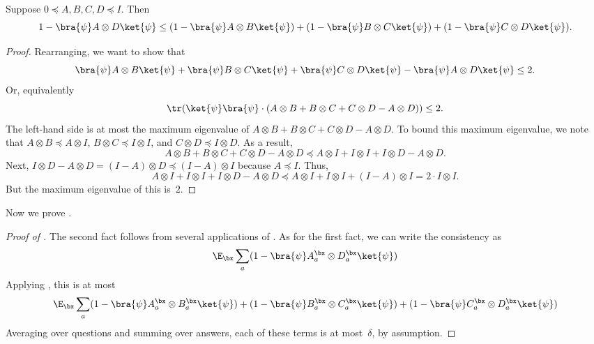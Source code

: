 \begin{fact}\label{fact:fun-matrix-fact}
Suppose $0 \preceq A, B, C, D \preceq I$.  Then
\begin{equation*}
1- \bra{\psi} A \otimes D \ket{\psi}
\leq (1 - \bra{\psi} A \otimes B \ket{\psi}) + (1 - \bra{\psi} B \otimes C \ket{\psi}) + (1 - \bra{\psi} C \otimes D \ket{\psi}).
\end{equation*}
\end{fact}
\begin{proof}
Rearranging, we want to show that
\begin{equation*}
\bra{\psi} A \otimes B \ket{\psi} + \bra{\psi} B \otimes C \ket{\psi} + \bra{\psi} C \otimes D \ket{\psi} - \bra{\psi} A \otimes D \ket{\psi}
\leq 2.
\end{equation*}
Or, equivalently
\begin{equation*}
\tr(\ket{\psi}\bra{\psi} \cdot (A \otimes B + B \otimes C + C \otimes D - A \otimes D)) \leq 2.
\end{equation*}
The left-hand side is at most the maximum eigenvalue of $A \otimes B + B \otimes C + C \otimes D - A \otimes D$.
To bound this maximum eigenvalue, we note that $A \otimes B \preceq A \otimes I$, $B \otimes C \preceq I \otimes I$, and $C \otimes D \preceq I \otimes D$.
As a result, 
\begin{equation*}
A \otimes B + B \otimes C + C \otimes D - A \otimes D
\preceq A \otimes I + I \otimes I + I \otimes D - A \otimes D.
\end{equation*}
Next, $I \otimes D - A \otimes D = (I - A) \otimes D \preceq (I-A) \otimes I$ because $A \preceq I$.
Thus,
\begin{equation*}
A \otimes I + I \otimes I + I \otimes D - A \otimes D
\preceq A \otimes I + I \otimes I  + (I-A) \otimes I = 2 \cdot I \otimes I.
\end{equation*}
But the maximum eigenvalue of this is~$2$.
\end{proof}


Now we prove .
\begin{proof}[Proof of ]
The second fact follows from several applications of .
As for the first fact, we can write the consistency as
\begin{equation*}
\E_\bx \sum_a ( 1- \bra{\psi} A^{\bx}_a \otimes D^{\bx}_a \ket{\psi})
\end{equation*}
Applying , this is at most
\begin{equation*}
\E_\bx \sum_a (1 - \bra{\psi} A^\bx_a \otimes B^\bx_a \ket{\psi}) + (1 - \bra{\psi} B^\bx_a \otimes C^\bx_a \ket{\psi}) + (1 - \bra{\psi} C^\bx_a \otimes D^\bx_a \ket{\psi})
\end{equation*}
Averaging over questions and summing over answers, each of these terms is at most~$\delta$, by assumption.
\end{proof}

